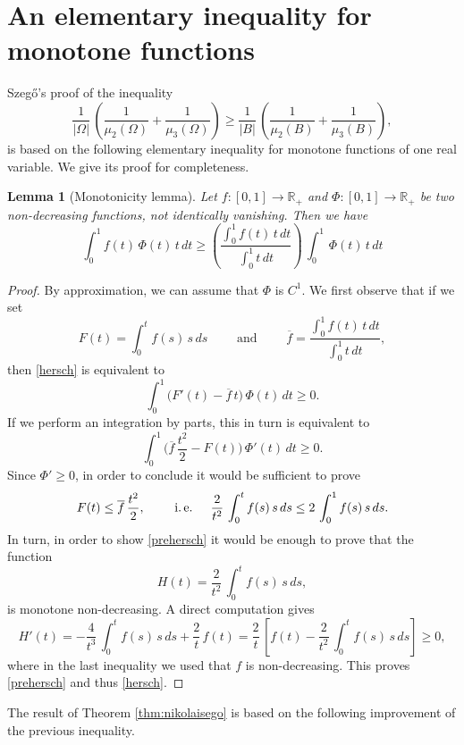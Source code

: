 \documentclass{amsart}
\newtheorem{lemma}{Lemma}[section]
\theoremstyle{definition}
\numberwithin{equation}{section}
\begin{document}
\section{An elementary inequality for monotone functions}

Szeg\H{o}'s proof of the inequality 
\[
\frac{1}{|\Omega|}\,\left(\frac{1}{\mu_2(\Omega)}+\frac{1}{\mu_3(\Omega)}\right)\ge \frac{1}{|B|}\,\left(\frac{1}{\mu_2(B)}+\frac{1}{\mu_3(B)}\right),
\]
is based on the following elementary inequality for monotone functions of one real variable. We give its proof for completeness.
\begin{lemma}[Monotonicity lemma]
\label{lm:hersch}
Let $f:[0,1]\to\mathbb{R}_+$ and $\Phi:[0,1]\to\mathbb{R}_+$ be two non-decreasing functions, not identically vanishing. Then we have
\begin{equation}
\label{hersch}
\displaystyle\int_0^1 f(t)\,\Phi(t)\,t\,dt\ge \left(\frac{\displaystyle\int_0^1 f(t)\,t\,dt}{\displaystyle\int_0^1 t\,dt}\right)\, \int_0^1\, \Phi(t)\,t\,dt
\end{equation}
\end{lemma}
\begin{proof}
By approximation, we can assume that $\Phi$ is $C^1$. We first observe that if we set 
\[
F(t)=\int_0^t f(s)\,s\,ds\qquad \mbox{ and }\qquad \overline f=\frac{\displaystyle\int_0^1 f(t)\,t\,dt}{\displaystyle\int_0^1 t\,dt},
\]
then \eqref{hersch} is equivalent to
\[
\int_0^1 \Big(F'(t)-\overline f\,t\Big)\, \Phi(t)\,dt\ge 0.
\]
If we perform an integration by parts, this in turn is equivalent to
\[
\int_0^1 \Big(\overline f\,\frac{t^2}{2}-F(t)\Big)\, \Phi'(t)\,dt\ge 0.
\]
Since $\Phi'\ge 0$, in order to conclude it would be sufficient to prove 
\begin{equation}
\label{prehersch}
F(t)\le \overline f\,\frac{t^2}{2},\qquad \mbox{ i.\,e. }\quad \frac{2}{t^2}\,\int_0^t f(s)\,s\,ds\le 2\,\int_0^1 f(s)\,s\,ds.
\end{equation}
In turn, in order to show \eqref{prehersch} it would be enough to prove that the function
\[
H(t)=\frac{2}{t^2}\,\int_0^t f(s)\,s\,ds,
\]
is monotone non-decreasing. A direct computation gives
\[
H'(t)=-\frac{4}{t^3}\,\int_0^t f(s)\,s\,ds+\frac{2}{t}\,f(t)=\frac{2}{t}\,\left[f(t)-\frac{2}{t^2}\,\int_0^t f(s)\,s\,ds\right]\ge 0,
\]
where in the last inequality we used that $f$ is non-decreasing. This proves \eqref{prehersch} and thus \eqref{hersch}.
\end{proof}
The result of Theorem \ref{thm:nikolaisego} is based on the following improvement of the previous inequality.
\end{document}
